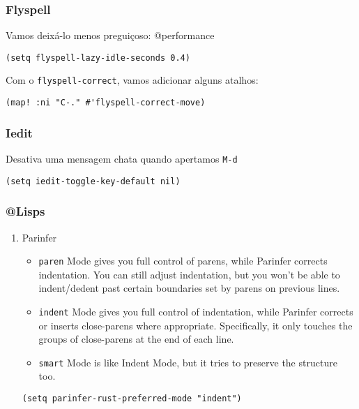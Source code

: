 \documentclass[11pt]{article}
\begin{document}
\subsubsection{Flyspell}
\label{sec:org7c4e731}

Vamos deixá-lo menos preguiçoso: @performance

\begin{verbatim}
(setq flyspell-lazy-idle-seconds 0.4)
\end{verbatim}

Com o \texttt{flyspell-correct}, vamos adicionar alguns atalhos:

\begin{verbatim}
(map! :ni "C-." #'flyspell-correct-move)
\end{verbatim}

\subsubsection{Iedit}
\label{sec:orgf09ad0e}

Desativa uma mensagem chata quando apertamos \texttt{M-d}

\begin{verbatim}
(setq iedit-toggle-key-default nil)
\end{verbatim}

\subsubsection{@Lisps}
\label{sec:orgccb0e39}
\begin{enumerate}
\item Parinfer
\label{sec:orga914064}

\begin{itemize}
\item \texttt{paren} Mode gives you full control of parens, while Parinfer corrects
indentation. You can still adjust indentation, but you won't be able to
indent/dedent past certain boundaries set by parens on previous lines.

\item \texttt{indent} Mode gives you full control of indentation, while Parinfer
corrects or inserts close-parens where appropriate. Specifically, it only
touches the groups of close-parens at the end of each line.

\item \texttt{smart} Mode is like Indent Mode, but it tries to preserve the structure too.
\end{itemize}

\begin{verbatim}
(setq parinfer-rust-preferred-mode "indent")
\end{verbatim}
\end{enumerate}
\end{document}
